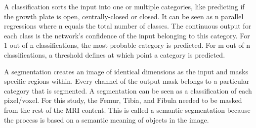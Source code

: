 A classification sorts the input into one or multiple categories, like predicting if the growth plate is open, centrally-closed or closed. It can be seen as n parallel regressions where n equals the total number of classes. The continuous output for each class is the network's confidence of the input belonging to this category. For 1 out of n classifications, the most probable category is predicted. For m out of n classifications, a threshold defines at which point a category is predicted.

A segmentation creates an image of identical dimensions as the input and masks specific regions within. Every channel of the output mask belongs to a particular category that is segmented. A segmentation can be seen as a classification of each pixel/voxel. For this study, the Femur, Tibia, and Fibula needed to be masked from the rest of the MRI content. This is called a semantic segmentation because the process is based on a semantic meaning of objects in the image.

\newpage